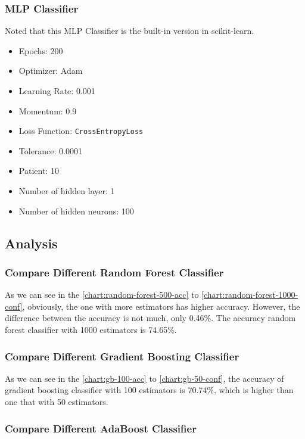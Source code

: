 \documentclass[twocolumn]{extarticle}
\begin{document}
\subsubsection{MLP Classifier}

Noted that this MLP Classifier is the built-in version in scikit-learn.

\begin{itemize}
\item Epochs: 200
\item Optimizer: Adam
\item Learning Rate: 0.001
\item Momentum: 0.9
\item Loss Function: \texttt{CrossEntropyLoss}
\item Tolerance: 0.0001
\item Patient: 10
\item Number of hidden layer: 1
\item Number of hidden neurons: 100
\end{itemize}

\subsection{Analysis}

\subsubsection{Compare Different Random Forest Classifier}

As we can see in the \autoref{chart:random-forest-500-acc} to \autoref{chart:random-forest-1000-conf}, obviously, the one with more estimators has higher accuracy. However, the difference between the accuracy is not much, only 0.46\%. The accuracy random forest classifier with 1000 estimators is 74.65\%.

\subsubsection{Compare Different Gradient Boosting Classifier}

As we can see in the \autoref{chart:gb-100-acc} to \autoref{chart:gb-50-conf}, the accuracy of gradient boosting classifier with 100 estimators is 70.74\%, which is higher than one that with 50 estimators.
\subsubsection{Compare Different AdaBoost Classifier}
\end{document}
